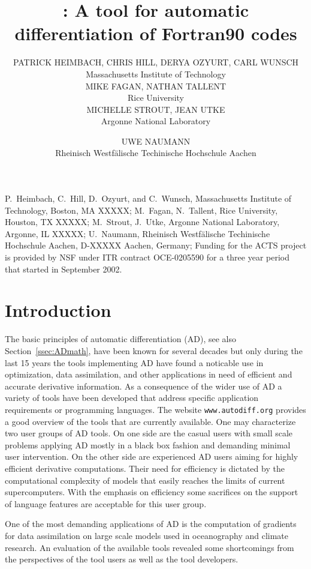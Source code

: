 \documentclass[acmtocl,acmnow]{acmtrans2m}
\title{\OpenAD: A tool for automatic differentiation 
of Fortran90 codes}
\author{PATRICK HEIMBACH, CHRIS HILL, DERYA OZYURT, CARL WUNSCH\\Massachusetts Institute of Technology\\
MIKE FAGAN, NATHAN TALLENT \\Rice University\\
MICHELLE STROUT, JEAN UTKE \\Argonne National Laboratory 
\and
UWE NAUMANN\\Rheinisch Westf\"alische Techinische Hochschule Aachen}
\newcommand{\refsec}[1]{Section~\ref{#1}}
\begin{document}
\begin{bottomstuff} 
P.~Heimbach, C.~Hill, D.~Ozyurt, and C.~Wunsch, Massachusetts Institute of Technology, 
Boston, MA XXXXX;\newline
M.~Fagan, N.~Tallent, Rice University, 
Houston, TX XXXXX;\newline
M.~Strout, J.~Utke, Argonne National Laboratory, 
Argonne, IL XXXXX;\newline
U.~Naumann, Rheinisch Westf\"alische Techinische Hochschule Aachen, 
D-XXXXX Aachen, Germany;\newline
Funding for the ACTS project is provided by NSF under ITR contract OCE-0205590
for a three year period that started in September 2002.
\end{bottomstuff}
\maketitle

\section{Introduction} \label{sec:Introduction}

The basic principles of automatic differentiation (AD), see also \refsec{ssec:ADmath}, 
have been known for several decades \cite{wengert}
but only during the last 15 years the tools implementing AD have found a noticable use in 
optimization, data assimilation, and other applications in need of efficient and accurate 
derivative information. 
As a consequence of the wider use of AD 
a variety of tools have been developed that address specific 
application requirements or programming languages. 
The website {\tt www.autodiff.org} provides a good overview of the tools that 
are currently available. 
One may characterize two user groups of AD tools. On one side are the casual users 
with small scale problems applying AD mostly in a black box fashion and demanding 
minimal user intervention. 
On the other side are experienced AD users aiming for highly efficient 
derivative computations. Their need for efficiency is dictated by the 
computational complexity of models that easily reaches the limits of  current 
supercomputers. With the emphasis on efficiency some sacrifices on the support of 
language features are acceptable for this user group. 

One of the most demanding applications of AD is the computation of gradients for 
data assimilation on large scale models used in oceanography and climate research. 
An evaluation of the available tools revealed some shortcomings from the perspectives 
of the tool users as well as the tool developers. 
\end{document}
